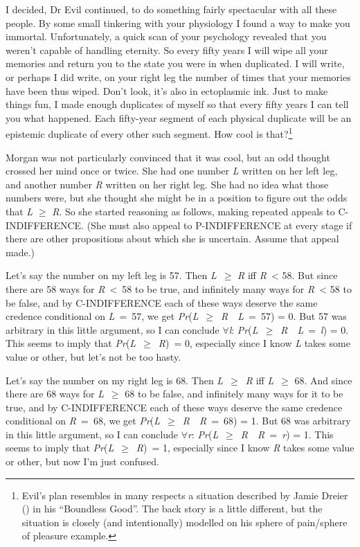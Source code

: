 \documentclass[
  11pt,
  letterpaper,
  DIV=11,
  numbers=noendperiod,
  twoside]{scrartcl}
\begin{document}
I decided, Dr Evil continued, to do something fairly spectacular with
all these people. By some small tinkering with your physiology I found a
way to make you immortal. Unfortunately, a quick scan of your psychology
revealed that you weren't capable of handling eternity. So every fifty
years I will wipe all your memories and return you to the state you were
in when duplicated. I will write, or perhaps I did write, on your right
leg the number of times that your memories have been thus wiped. Don't
look, it's also in ectoplasmic ink. Just to make things fun, I made
enough duplicates of myself so that every fifty years I can tell you
what happened. Each fifty-year segment of each physical duplicate will
be an epistemic duplicate of every other such segment. How cool is
that?\footnote{Evil's plan resembles in many respects a situation
  described by Jamie Dreier () in his
  ``Boundless Good''. The back story is a little different, but the
  situation is closely (and intentionally) modelled on his sphere of
  pain/sphere of pleasure example.}

Morgan was not particularly convinced that it was cool, but an odd
thought crossed her mind once or twice. She had one number \emph{L}
written on her left leg, and another number \emph{R} written on her
right leg. She had no idea what those numbers were, but she thought she
might be in a position to figure out the odds that \emph{L} \({\geq}\)
\emph{R}. So she started reasoning as follows, making repeated appeals
to C-INDIFFERENCE. (She must also appeal to P-INDIFFERENCE at every
stage if there are other propositions about which she is uncertain.
Assume that appeal made.)

Let's say the number on my left leg is 57. Then \emph{L}~\({\geq}\)
\emph{R} iff \emph{R}~\textless{} 58. But since there are 58 ways for
\emph{R}~\textless~58 to be true, and infinitely many ways for
\emph{R}~\textless{} 58 to be false, and by C-INDIFFERENCE each of these
ways deserve the same credence conditional on \emph{L}~=~57, we get
\emph{Pr}(\emph{L}~\({\geq}\)~\emph{R}~~\emph{L}~=~57) = 0. But 57 was
arbitrary in this little argument, so I can conclude
\({\forall}\)\emph{l}:
\emph{Pr}(\emph{L}~\({\geq}\)~\emph{R}~~\emph{L}~=~\emph{l}) = 0. This
seems to imply that \emph{Pr}(\emph{L}~\({\geq}\)~\emph{R})~= 0,
especially since I know \emph{L} takes some value or other, but let's
not be too hasty.

Let's say the number on my right leg is 68. Then
\emph{L}~\({\geq}\)~\emph{R} iff \emph{L}~\({\geq}\) 68. And since there
are 68 ways for \emph{L}~\({\geq}\) 68 to be false, and infinitely many
ways for it to be true, and by C-INDIFFERENCE each of these ways deserve
the same credence conditional on \emph{R}~=~68, we get
\emph{Pr}(\emph{L}~\({\geq}\)~\emph{R}~~\emph{R}~=~68) = 1. But 68 was
arbitrary in this little argument, so I can conclude
\({\forall}\)\emph{r}:
\emph{Pr}(\emph{L}~\({\geq}\)~\emph{R}~~\emph{R}~=~\emph{r}) = 1. This
seems to imply that \emph{Pr}(\emph{L}~\({\geq}\)~\emph{R})~= 1,
especially since I know \emph{R} takes some value or other, but now I'm
just confused.
\end{document}
